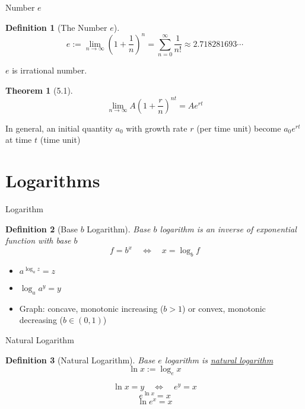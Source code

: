 \documentclass[a4paper,11pt]{article}
\newtheorem{defn}{Definition}
\newtheorem{thm}{Theorem}
\begin{document}
\begin{frame}[t]{Number $e$}
	\begin{defn}
		[The Number $e$]
		\[
			e:=\lim_{n\rightarrow \infty}\left(1+\frac 1 n \right)^n = \sum_{n=0}^\infty \frac 1 {n!} \approx 2.718281693\cdots
		\]
	\end{defn}
	
	$e$ is irrational number.
	
	\begin{thm}
		[5.1]\[
			\lim_{n\rightarrow\infty}A\left(1+\frac r n \right)^{nt} = Ae^{rt}
		\]
	\end{thm}
	In general, an initial quantity $a_0$ with growth rate $r$ (per time unit) become $a_0 e^{rt}$ at time $t$ (time unit)
\end{frame}

\section{Logarithms} %
\label{sec:logarithms}

\begin{frame}[t]{Logarithm}
	\begin{defn}
		[Base $b$ Logarithm]
		Base $b$ logarithm is an inverse of exponential function with base $b$
		\[
			f = b^x  \quad\Leftrightarrow\quad x = \log_b f
		\]
	\end{defn}

		\begin{itemize}
			\item $a^{\log_a z}=z$
			\item $\log_a{a^y}=y$
			\item Graph: concave, monotonic increasing ($b>1$) or convex, monotonic decreasing ($b\in(0,1)$)
		\end{itemize}
\end{frame}

\begin{frame}[t]{Natural Logarithm}
	\begin{defn}
		[Natural Logarithm]
		Base $e$ logarithm is \uline{natural logarithm}\[
			\ln x := \log_e x
		\]
	\end{defn}
	\[
		\ln x = y \quad \Leftrightarrow \quad e^y = x
	\]\[
		e^{\ln x} = x 
	\]\[
		\ln e^x = x
	\]
\end{frame}

	
\end{document}
